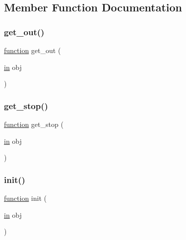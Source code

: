 \subsection{Member Function Documentation}
\mbox{\label{class_wrapper_a15af7c208437e3c98d1f130b45a36a37}} 
\subsubsection{\texorpdfstring{get\+\_\+out()}{get\_out()}}
{\footnotesize\ttfamily \hyperlink{_plan__desuma_functions_8m_ac2ffb26d6f42d3bbcd7847b0873403f4}{function} get\+\_\+out (\begin{DoxyParamCaption}\item[{\hyperlink{class_wrapper_a5e252d97ca5bf85c5753e2914673eead}{in}}]{obj }\end{DoxyParamCaption})}

\mbox{\label{class_wrapper_aaba4a98b8b3bf391348722f0f227e333}} 
\subsubsection{\texorpdfstring{get\+\_\+stop()}{get\_stop()}}
{\footnotesize\ttfamily \hyperlink{_plan__desuma_functions_8m_ac2ffb26d6f42d3bbcd7847b0873403f4}{function} get\+\_\+stop (\begin{DoxyParamCaption}\item[{\hyperlink{class_wrapper_a5e252d97ca5bf85c5753e2914673eead}{in}}]{obj }\end{DoxyParamCaption})}

\mbox{\label{class_wrapper_a7d486dd79e7c7bc857ffaa4e273d27c5}} 
\subsubsection{\texorpdfstring{init()}{init()}}
{\footnotesize\ttfamily \hyperlink{_plan__desuma_functions_8m_ac2ffb26d6f42d3bbcd7847b0873403f4}{function} init (\begin{DoxyParamCaption}\item[{\hyperlink{class_wrapper_a5e252d97ca5bf85c5753e2914673eead}{in}}]{obj }\end{DoxyParamCaption})}

